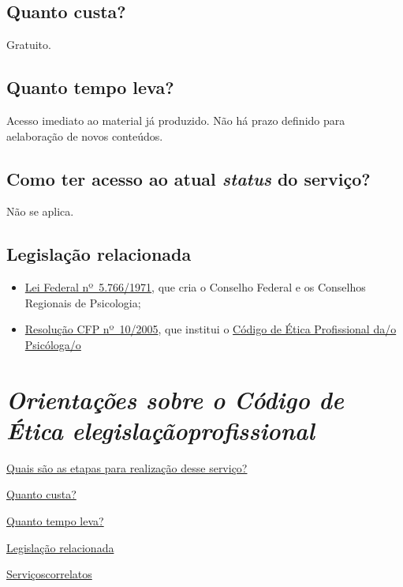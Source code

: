 \section{Quanto custa?}

Gratuito.

\section{Quanto tempo leva?}

Acesso imediato ao material já produzido. Não há prazo definido para aelaboração de novos conteúdos.

\section{Como ter acesso ao atual \emph{status} do serviço?}

Não se aplica.

\section{Legislação relacionada}

\begin{itemize}
  \item  \href{http://www.planalto.gov.br/ccivil_03/leis/l5766.htm}{Lei Federal  nº~5.766/1971}, que cria o Conselho Federal e os Conselhos Regionais  de Psicologia;
  \item  \href{https://atosoficiais.com.br/cfp/resolucao-do-exercicio-profissional-n-10-2005-aprova-o-codigo-de-etica-profissional-do-psicologo}{Resolução  CFP nº~10/2005}, que institui o  \href{https://www.crpsp.org/uploads/pagina/289379/2j9LIMPLJ9jFr5YrK57HmAiBWjVMxdbe.pdf}{Código  de Ética Profissional da/o Psicóloga/o}
\end{itemize}

\chapter{\texorpdfstring{\emph{Orientações sobre o Código de Ética elegislaçãoprofissional}}{Orientações sobre o Código de Ética e legislação profissional}}
\hyperref[]{Quais são as etapas para realização desse serviço?}

\hyperref[]{Quanto custa?}

\hyperref[]{Quanto tempo leva?}

\hyperref[]{Legislação relacionada}

\hyperref[]{Serviçoscorrelatos}

